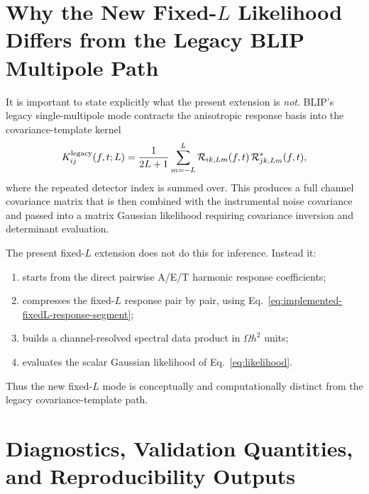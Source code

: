 \documentclass[11pt]{article}
\newcommand{\Rlm}{\mathcal{R}}
\begin{document}
\section{Why the New Fixed-$L$ Likelihood Differs from the Legacy BLIP Multipole Path}

It is important to state explicitly what the present extension is \emph{not}.  BLIP's legacy single-multipole mode contracts the anisotropic response basis into the covariance-template kernel
\begin{equation}
  K^{\rm legacy}_{ij}(f,t;L)
  =
  \frac{1}{2L+1}
  \sum_{m=-L}^{L}
  \Rlm_{ik,Lm}(f,t)\,
  \Rlm^\ast_{jk,Lm}(f,t),
\end{equation}
where the repeated detector index is summed over.  This produces a full channel covariance matrix that is then combined with the instrumental noise covariance and passed into a matrix Gaussian likelihood requiring covariance inversion and determinant evaluation.

The present fixed-$L$ extension does not do this for inference.  Instead it:
\begin{enumerate}[leftmargin=2.5em]
  \item starts from the direct pairwise A/E/T harmonic response coefficients;
  \item compresses the fixed-$L$ response pair by pair, using Eq.~\eqref{eq:implemented-fixedL-response-segment};
  \item builds a channel-resolved spectral data product in $\Omega h^2$ units;
  \item evaluates the scalar Gaussian likelihood of Eq.~\eqref{eq:likelihood}.
\end{enumerate}
Thus the new fixed-$L$ mode is conceptually and computationally distinct from the legacy covariance-template path.

\section{Diagnostics, Validation Quantities, and Reproducibility Outputs}
\end{document}
